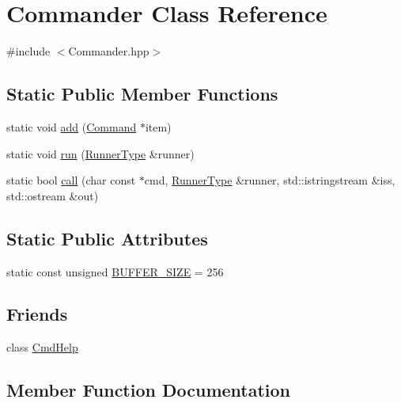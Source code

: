 \hypertarget{classCommander}{}\section{Commander Class Reference}
\label{classCommander}


{\ttfamily \#include $<$Commander.\+hpp$>$}

\subsection*{Static Public Member Functions}
\begin{DoxyCompactItemize}
\item 
static void \hyperlink{classCommander_a467f6a4ceeb5dab750cf3f4821b5db90}{add} (\hyperlink{classCommand}{Command} $\ast$item)
\item 
static void \hyperlink{classCommander_afea1bfe2bc8dbeea0d0523f369c9539e}{run} (\hyperlink{Command_8hpp_ad45c3de597c2023a8be0399d914161f4}{Runner\+Type} \&runner)
\item 
static bool \hyperlink{classCommander_a28323e9560f01aba51869d54832ca987}{call} (char const $\ast$cmd, \hyperlink{Command_8hpp_ad45c3de597c2023a8be0399d914161f4}{Runner\+Type} \&runner, std\+::istringstream \&iss, std\+::ostream \&out)
\end{DoxyCompactItemize}
\subsection*{Static Public Attributes}
\begin{DoxyCompactItemize}
\item 
static const unsigned \hyperlink{classCommander_a9e1b32d844b2d8080e51c4e8a4ca0442}{B\+U\+F\+F\+E\+R\+\_\+\+S\+I\+ZE} = 256
\end{DoxyCompactItemize}
\subsection*{Friends}
\begin{DoxyCompactItemize}
\item 
class \hyperlink{classCommander_aaf5700242631ebac67a8b2f6eaf9c730}{Cmd\+Help}
\end{DoxyCompactItemize}


\subsection{Member Function Documentation}
\mbox{\label{classCommander_a467f6a4ceeb5dab750cf3f4821b5db90}} 
